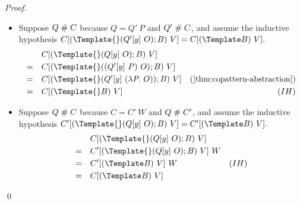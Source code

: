\begin{proof}
\begin{itemize}
  \item Suppose $Q \mathrel{\#} C$ because $Q = Q' ~ P$ and $Q' \mathrel{\#} C$, and assume the inductive hypothesis
    \begin{math}
      C[(\Template{} (Q'[y] ~ O); B) ~ V] = C[(\Template B) ~ V]
      .
    \end{math}
    \begin{align*}
      & \quad
      C[(\Template{} (Q[y] ~ O); B) ~ V]
      \\
      =& \quad
      C[(\Template{} ((Q'[y] ~P) ~ O); B) ~ V]
      \\
      =& \quad
      C[(\Template{} (Q'[y] ~ (\lambda P. ~O)); B) ~ V]
      & (\cref{thm:copattern-abstraction})
      \\
      =& \quad
      C[(\Template{} B) ~ V]
      & (IH)
    \end{align*}
  \item Suppose $Q \mathrel{\#} C$ because $C = C' ~ W$ and  $Q \mathrel{\#} C'$, and assume the inductive hypothesis
    \begin{math}
      C'[(\Template{} (Q[y] ~ O); B) ~ V] = C'[(\Template B) ~ V]
      .
    \end{math}
    \begin{align*}
      & \quad
      C[(\Template{} (Q[y] ~ O); B) ~ V]
      \\
      =& \quad
      C'[(\Template{} (Q[y] ~ O); B) ~ V] ~ W
      \\
      =& \quad
      C'[(\Template B) ~ V] ~W
      & (IH)
      \\
      =& \quad
      C[(\Template B) ~ V]
    \end{align*}
  \end{itemize}
  \qed
\end{proof}

  
